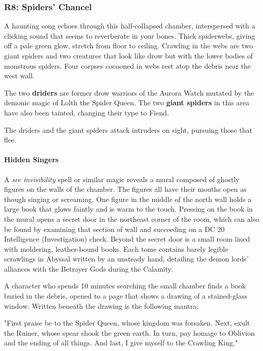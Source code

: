 \documentclass[letterpaper, 11pt, bg=full, twocolumn]{dndbook}
\begin{document}
\subsubsection{R8: Spiders' Chancel}

\begin{DndReadAloud}
A haunting song echoes through this half-collapsed chamber, interspersed with a clicking sound that seems to reverberate in your bones. Thick spiderwebs, giving off a pale green glow, stretch from floor to ceiling. Crawling in the webs are two giant spiders and two creatures that look like drow but with the lower bodies of monstrous spiders. Four corpses cocooned in webs rest atop the debris near the west wall.
\end{DndReadAloud}

The two \textbf{driders} are former drow warriors of the Aurora Watch mutated by the demonic magic of Lolth the Spider Queen. The two \textbf{giant spiders} in this area have also been tainted, changing their type to Fiend.

The driders and the giant spiders attack intruders on sight, pursuing those that flee.

\paragraph{Hidden Singers}

A \textit{see invisibility} spell or similar magic reveals a mural composed of ghostly figures on the walls of the chamber. The figures all have their mouths open as though singing or screaming. One figure in the middle of the north wall holds a large book that glows faintly and is warm to the touch. Pressing on the book in the mural opens a secret door in the northeast corner of the room, which can also be found by examining that section of wall and succeeding on a DC 20 Intelligence (Investigation) check. Beyond the secret door is a small room lined with moldering, leather-bound books. Each tome contains barely legible scrawlings in Abyssal written by an unsteady hand, detailing the demon lords' alliances with the Betrayer Gods during the Calamity.

A character who spends 10 minutes searching the small chamber finds a book buried in the debris, opened to a page that shows a drawing of a stained-glass window. Written beneath the drawing is the following mantra:

\begin{DndReadAloud}
"First praise be to the Spider Queen, whose kingdom was forsaken. Next, exult the Ruiner, whose spear shook the green earth. In turn, pay homage to Oblivion and the ending of all things. And last, I give myself to the Crawling King."
\end{DndReadAloud}
\end{document}
